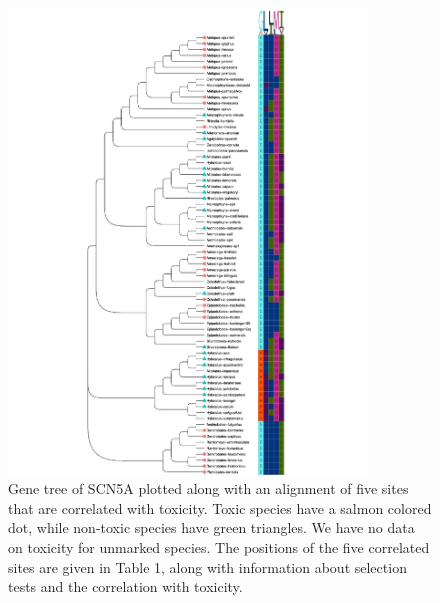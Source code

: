 \documentclass{article}
\begin{document}
\begin{figure}[h!]
    \centering
    \includegraphics[width=0.85\textwidth]{figures/SCN5A.corrTree.trimmed.pdf}
    \caption{Gene tree of SCN5A plotted along with an alignment of five sites that are correlated with toxicity. Toxic species have a salmon colored dot, while non-toxic species have green triangles. We have no data on toxicity for unmarked species. The positions of the five correlated sites are given in Table 1, along with information about selection tests and the correlation with toxicity.}
    \label{fig:my_label}
\end{figure}
\clearpage
\end{document}
